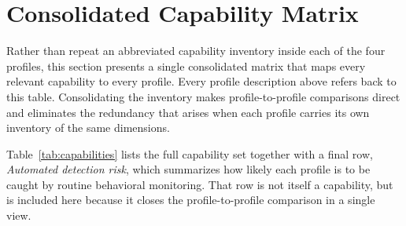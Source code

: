 \documentclass[a4paper,12pt]{report}
\begin{document}
\newpage
\section{Consolidated Capability Matrix}
\label{sec:capability-matrix}

Rather than repeat an abbreviated capability inventory inside each of the
four profiles, this section presents a single consolidated matrix that
maps every relevant capability to every profile. Every profile description
above refers back to this table. Consolidating the inventory makes
profile-to-profile comparisons direct and eliminates the redundancy that
arises when each profile carries its own inventory of the same dimensions.

Table~\ref{tab:capabilities} lists the full capability set together with
a final row, \emph{Automated detection risk}, which summarizes how likely
each profile is to be caught by routine behavioral monitoring. That row
is not itself a capability, but is included here because it closes the
profile-to-profile comparison in a single view.

\vspace{0.4cm}
\end{document}
